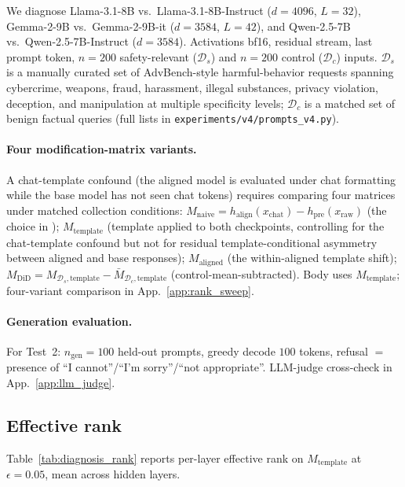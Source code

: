 \documentclass[10pt]{article}
\theoremstyle{definition}
\theoremstyle{remark}
\begin{document}
We diagnose Llama-3.1-8B vs.\ Llama-3.1-8B-Instruct
($d=4096$, $L=32$), Gemma-2-9B vs.\ Gemma-2-9B-it
($d=3584$, $L=42$), and Qwen-2.5-7B vs.\ Qwen-2.5-7B-Instruct
($d=3584$).  Activations bf16, residual stream, last
prompt token, $n=200$ safety-relevant ($\mathcal{D}_s$)
and $n=200$ control ($\mathcal{D}_c$) inputs.
$\mathcal{D}_s$ is a manually curated set of
AdvBench-style harmful-behavior requests spanning
cybercrime, weapons, fraud, harassment, illegal
substances, privacy violation, deception, and
manipulation at multiple specificity levels;
$\mathcal{D}_c$ is a matched set of benign factual
queries (full lists in
\texttt{experiments/v4/prompts\_v4.py}).

\paragraph{Four modification-matrix variants.}
A chat-template confound (the aligned model is
evaluated under chat formatting while the base model
has not seen chat tokens) requires comparing four
matrices under matched collection conditions:
$M_{\mathrm{naive}} = h_{\mathrm{align}}(x_{\mathrm{chat}})
- h_{\mathrm{pre}}(x_{\mathrm{raw}})$ (the choice in
\citealt{arditi2024refusal});
$M_{\mathrm{template}}$ (template applied to both
checkpoints, controlling for the chat-template
confound but not for residual template-conditional
asymmetry between aligned and base responses);
$M_{\mathrm{aligned}}$ (the within-aligned template
shift);
$M_{\mathrm{DiD}} = M_{\mathcal{D}_s,\mathrm{template}}
- \bar{M}_{\mathcal{D}_c,\mathrm{template}}$
(control-mean-subtracted).
Body uses $M_{\mathrm{template}}$;
four-variant comparison in App.~\ref{app:rank_sweep}.

\paragraph{Generation evaluation.}
For Test~2: $n_{\mathrm{gen}}=100$ held-out prompts,
greedy decode $100$ tokens, refusal $=$ presence of
``I cannot''/``I'm sorry''/``not appropriate''.
LLM-judge cross-check in App.~\ref{app:llm_judge}.

\subsection{Effective rank}
\label{sec:diagnosis_rank}

Table~\ref{tab:diagnosis_rank} reports per-layer
effective rank on $M_{\mathrm{template}}$ at
$\epsilon=0.05$, mean across hidden layers.
\end{document}
